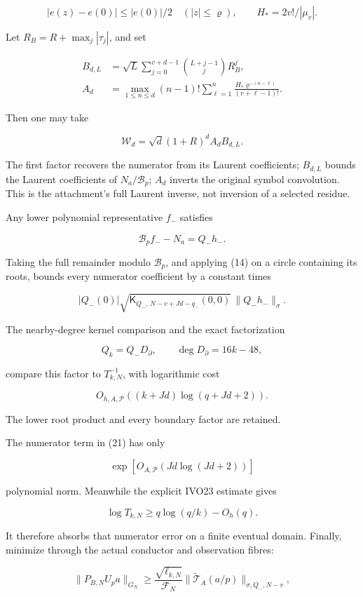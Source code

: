 \documentclass[11pt]{article}
\begin{document}
\[
|e(z)-e(0)|\le |e(0)|/2
\quad(|z|\le\varrho),
\qquad
H_*=2v!/|\mu_v|.
\]

Let \(R_B=R+\max_j|\tau_j|\), and set

\[
\begin{aligned}
B_{d,L}
&=\sqrt L\sum_{j=0}^{v+d-1}
\binom{L+j-1}{j}R_B^j,\\
A_d
&=\max_{1\le n\le d}
(n-1)!\sum_{\ell=1}^{n}
\frac{H_*\varrho^{-(n-\ell)}}{(v+\ell-1)!}.
\end{aligned}
\]

Then one may take

\[
\boxed{
\mathcal W_d
=
\sqrt d(1+R)^d A_dB_{d,L}.
}
\tag{20}
\]

The first factor recovers the numerator from its Laurent coefficients; \(B_{d,L}\) bounds the Laurent coefficients of \(N_a/\mathcal B_p\); \(A_d\) inverts the original symbol convolution. This is the attachment's full Laurent inverse, not inversion of a selected residue.

Any lower polynomial representative \(f_-\) satisfies

\[
\mathcal B_pf_--N_a=Q_-h_-.
\tag{21}
\]

Taking the full remainder modulo \(\mathcal B_p\), and applying (14) on a circle containing its roots, bounds every numerator coefficient by a constant times

\[
|Q_-(0)|\sqrt{\mathsf K_{Q_-,\,N-v+Jd-q_-}(0,0)}
\,\|Q_-h_-\|_\sigma.
\]

The nearby-degree kernel comparison and the exact factorization

\[
Q_k=Q_-D_\partial,\qquad \deg D_\partial=16k-48,
\]

compare this factor to \(T_{k,N}^{-1}\), with logarithmic cost

\[
O_{h,A,\mathscr P}((k+Jd)\log(q+Jd+2)).
\]

The lower root product and every boundary factor are retained.

The numerator term in (21) has only

\[
\exp[O_{A,\mathscr P}(Jd\log(Jd+2))]
\]

polynomial norm. Meanwhile the explicit IVO23 estimate gives

\[
\log T_{k,N}\ge q\log(q/k)-O_h(q).
\]

It therefore absorbs that numerator error on a finite eventual domain. Finally, minimize through the actual conductor and observation fibres:

\[
\|P_{B,N}U_pa\|_{G_N}
\ge
\frac{\sqrt{\ell_{k,N}}}{\mathcal F_N}
\|\widetilde{\mathcal T}_A(a/p)\|_{\sigma,Q_-,N-v},
\]
\end{document}
